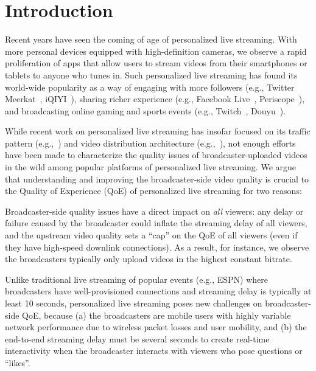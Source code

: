 \section{Introduction}
Recent years have seen the coming of age of personalized live
streaming. With more personal devices equipped with high-definition
cameras, we observe a rapid proliferation of apps that allow users
to stream videos from their smartphones or tablets to anyone who
tunes in. Such personalized live streaming has found its world-wide
popularity as a way of engaging with more followers (e.g., Twitter Meerkat~\cite{twitter}, iQIYI~\cite{iqiyi}),
sharing richer experience (e.g., Facebook Live~\cite{facebook}, Periscope~\cite{periscope}),
and broadcasting online gaming and sports events (e.g., Twitch~\cite{twitch}, Douyu~\cite{douyu}).


While recent work on personalized live streaming has insofar
focused on its traffic pattern (e.g.,~\cite{zhang2015crowdsourced,tang2016meerkat})
and video distribution architecture (e.g.,~\cite{siekkinen2016first,wang2016anatomy}),
not enough efforts have been made to characterize the
quality issues of broadcaster-uploaded videos in the wild among popular platforms of
personalized live streaming.
We argue that understanding and improving the broadcaster-side
video quality is crucial to the Quality of Experience (QoE) of personalized live streaming for two reasons:
\begin{packedenumerate}
\item Broadcaster-side quality issues
have a direct impact on {\em all} viewers:
any delay or failure caused by the broadcaster could inflate the
streaming delay of all viewers, and the upstream video quality
sets a ``cap'' on the QoE of all
viewers (even if they have high-speed downlink connections).
As a result, for instance, we observe
the broadcasters typically only upload videos in the highest constant
bitrate.
\item Unlike traditional live streaming of popular events
(e.g., ESPN) where broadcasters have well-provisioned
connections and streaming delay is typically at least 10 seconds,
personalized live streaming poses new challenges on
broadcaster-side QoE, because
(a) the broadcasters are mobile users with highly variable
network performance due to wireless packet losses and
user mobility, and
(b) the end-to-end streaming delay must be
several seconds to create real-time interactivity when
the broadcaster interacts with viewers who pose questions
or ``likes''.
\end{packedenumerate}

